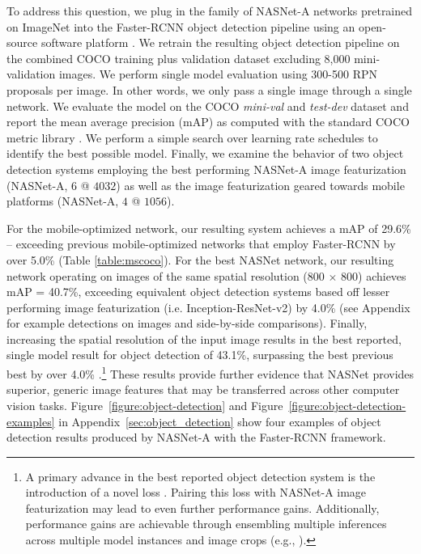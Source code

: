 \documentclass[10pt,twocolumn,letterpaper]{article}
\begin{document}
To address this question, we plug in the family of NASNet-A networks pretrained on ImageNet into the Faster-RCNN object detection pipeline \cite{faster_rcnn} using an open-source software platform \cite{huang2016speed}. We retrain the resulting object detection pipeline on the combined COCO training plus validation dataset excluding 8,000 mini-validation images.
We perform single model evaluation using 300-500 RPN proposals per image. In other words, we only
pass a single image through a single network. We evaluate the model on the COCO {\it mini-val}\cite{huang2016speed} and {\it test-dev} dataset and report the mean average precision (mAP) as computed with the standard COCO metric library \cite{lin2014microsoft}. We perform a simple search over learning rate schedules to identify the best possible model. Finally, we examine the behavior of two object detection systems employing the best performing NASNet-A image featurization (NASNet-A, $6$ @ $4032$) as well as the image featurization geared towards mobile platforms (NASNet-A, $4$ @ $1056$).

For the mobile-optimized network, our resulting system achieves a mAP of 29.6\% -- exceeding previous mobile-optimized networks that employ Faster-RCNN by over 5.0\% (Table \ref{table:mscoco}). For the best NASNet network, our resulting network operating on images of the same spatial resolution (800 $\times$ 800) achieves mAP = 40.7\%, exceeding equivalent object detection systems based off lesser performing image featurization (i.e. Inception-ResNet-v2) by 4.0\% \cite{huang2016speed,shrivastava2016beyond} (see Appendix for example detections on images and side-by-side comparisons). Finally, increasing the spatial resolution of the input image results in the best reported, single model result for object detection of 43.1\%, surpassing the best previous best by over 4.0\% \cite{lin2017focal}.\footnote{A primary advance in the best reported object detection system is the introduction of a novel loss \cite{lin2017focal}. Pairing this loss with NASNet-A image featurization may lead to even further performance gains. Additionally, performance gains are achievable through ensembling multiple inferences across multiple model instances and image crops (e.g., \cite{huang2016speed}).} These results provide further evidence that NASNet provides superior, generic image features that may be transferred across other computer vision tasks. Figure~\ref{figure:object-detection} and Figure~\ref{figure:object-detection-examples} in Appendix~\ref{sec:object_detection} show four examples of object detection results produced by NASNet-A with the Faster-RCNN framework.
\end{document}
